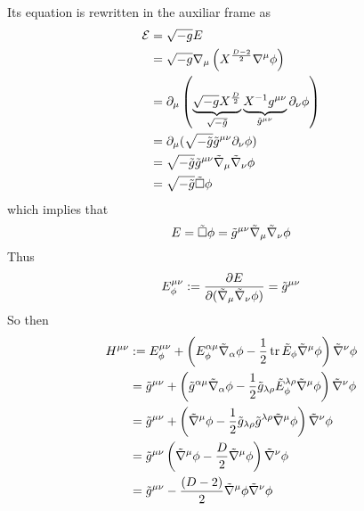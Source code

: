 Its equation is rewritten in the auxiliar frame as
\begin{align}
  \mathcal{E}&=\sqrt{-g}E\\
  &=\sqrt{-g}\nabla_\mu \left(X^{\frac{D-2}{2}}\nabla^\mu \phi \right)\\
  &=\partial_\mu \left(\underbrace{\sqrt{-g}X^\frac{D}{2}}_{\sqrt{-\tilde{g}}}\underbrace{X^{-1}g^{\mu\nu }}_{\tilde{g}^{\mu\nu }}\partial_\nu \phi \right)\\
  &=\partial_\mu (\sqrt{-\tilde{g}}\tilde{g}^{\mu\nu }\partial_\nu \phi )\\
  &=\sqrt{-\tilde{g}}\tilde{g}^{\mu\nu }\tilde{\nabla}_\mu\tilde{\nabla}_\nu\phi \\
  &=\sqrt{-\tilde{g}}\tilde{\Box }\phi 
\end{align}
which implies that
\begin{equation}
  E=\tilde{\Box }\phi =\tilde{g}^{\mu\nu }\tilde{\nabla}_\mu \tilde{\nabla}_\nu\phi 
\end{equation}
Thus
\begin{equation}
  E^{\mu\nu }_\phi :=\pdv{E}{(\tilde{\nabla}_\mu\tilde{\nabla}_\nu\phi)}=\tilde{g}^{\mu\nu }
\end{equation}
So then
\begin{align}
  H^{\mu\nu }&:=E^{\mu\nu }_\phi+\left(E^{\alpha\mu  }_\phi \tilde{\nabla}_\alpha \phi-\frac{1}{2}\tr\tilde{E}_\phi\tilde{\nabla}^\mu\phi \right)\tilde{\nabla}^\nu\phi \notag \\
  &=\tilde{g}^{\mu\nu } +\left(\tilde{g}^{\alpha\mu }\tilde{\nabla}_\alpha\phi -\frac{1}{2}\tilde{g}_{\lambda\rho }\tilde{E}^{\lambda\rho }_\phi \tilde{\nabla}^\mu\phi \right)\tilde{\nabla}^\nu\phi \notag  \\
  &=\tilde{g}^{\mu\nu }+\left(\tilde{\nabla}^\mu\phi-\frac{1}{2}\tilde{g}_{\lambda\rho }\tilde{g}^{\lambda\rho }\tilde{\nabla}^\mu\phi \right)\tilde{\nabla}^\nu\phi \notag \\
  &=\tilde{g}^{\mu\nu }\left(\tilde{\nabla}^\mu\phi -\frac{D}{2}\tilde{\nabla}^\mu\phi \right)\tilde{\nabla}^\nu\phi \notag  \\
  &=\tilde{g}^{\mu\nu }-\frac{(D-2)}{2}\tilde{\nabla}^\mu\phi\tilde{\nabla}^\nu\phi \label{Hmn-auxiliar-frame}
\end{align}

